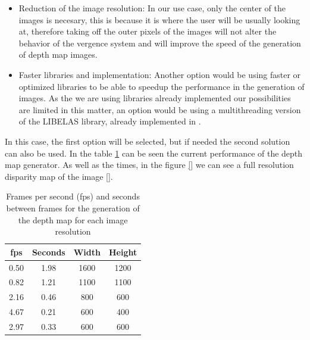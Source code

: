 \documentclass[10pt,a4paper,twocolumn,twoside]{article}
\begin{document}
	\begin{itemize}
		\item Reduction of the image resolution: In our use case, only the center of the images is necesary, this is because it is where the user will be usually looking at, therefore taking off the outer pixels of the images will not alter the behavior of the vergence system and will improve the speed of the generation of depth map images.
		
		\item Faster libraries and implementation: Another option would be using faster or optimized libraries to be able to speedup the performance in the generation of images. As the we are using libraries already implemented our possibilities are limited in this matter, an option would be using a multithreading version of the LIBELAS library, already implemented in \cite{web:LIBELAS}.
	\end{itemize}
	In this case, the first option will be selected, but if needed the second solution can also be used. In the table \ref{tab:depthmap} can be seen the current performance of the depth map generator. As well as the times, in the figure \ref{} we can see a full resolution disparity map of the image \ref{}.

	\begin{table}[t!]
		\begin{center}
			\begin{tabular}{cccc}
				\toprule
				fps & Seconds & Width & Height \\ 
				\midrule
				0.50 & 1.98 & 1600 & 1200 \\ 
		
				0.82 & 1.21 & 1100 & 1100 \\ 
		
				2.16 & 0.46 & 800 & 600 \\ 
		
				4.67 & 0.21 & 600 & 400 \\ 
		
				2.97 & 0.33 & 600 & 600 \\ 
				\bottomrule
				
			\end{tabular} 
			\caption{Frames per second (fps) and seconds between frames for the generation of the depth map for each image resolution }
			\label{tab:depthmap}
		\end{center}
	\end{table}

	
\end{document}

